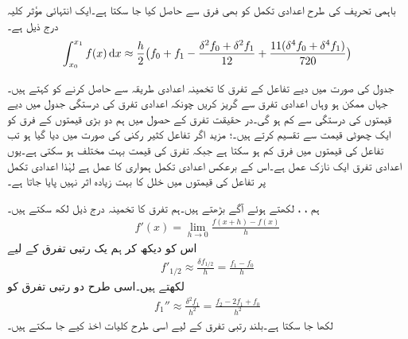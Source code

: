 باہمی تحریف کی طرح اعدادی تکمل کو بھی فرق سے حاصل کیا جا سکتا ہے۔ایک انتہائی مؤثر کلیہ درج ذیل   ہے۔
\begin{align}
\int_{x_0}^{x_1}f(x)\dif x\approx \frac{h}{2}\big(f_0+f_1-\frac{\delta^2 f_0+\delta^2f_1}{12}+\frac{11(\delta^4f_0+\delta^4f_1)}{720}\big)
\end{align}

جدول کی صورت میں دیے تفاعل کے تفرق کا تخمینہ اعدادی طریقہ  سے حاصل کرنے  کو  کہتے ہیں۔ جہاں ممکن ہو وہاں اعدادی تفرق سے گریز کریں چونکہ اعدادی تفرق کی درستگی  جدول میں دیے قیمتوں کی درستگی سے کم ہو گی۔در حقیقت تفرق کے حصول میں ہم دو بڑی قیمتوں کے فرق کو ایک چھوٹی قیمت سے تقسیم کرتے ہیں۔؛ مزید اگر تفاعل کثیر رکنی  کی صورت میں دیا گیا ہو تب تفاعل کی قیمتوں میں فرق کم ہو سکتا ہے جبکہ تفرق کی قیمت بہت مختلف ہو سکتی ہے۔یوں اعدادی تفرق ایک نازک عمل ہے۔اس کے برعکس اعدادی تکمل ہمواری کا عمل ہے لہٰذا اعدادی تکمل  پر تفاعل کی قیمتوں میں خلل کا بہت زیادہ اثر نہیں پایا جاتا ہے۔

ہم ، ،  لکھتے ہوئے آگے بڑھتے ہیں۔ہم تفرق کا تخمینہ درج ذیل لکھ سکتے ہیں۔
\begin{align*}
f'(x)=\lim_{h\to 0}\frac{f(x+h)-f(x)}{h}
\end{align*}
اس کو دیکھ کر ہم یک رتبی تفرق کے لیے
\begin{align}\label{مساوات_اعدادی_تفرق_کلیہ_الف}
f'_{1/2}\approx \frac{\delta f_{1/2}}{h}=\frac{f_1-f_0}{h}
\end{align}
لکھتے ہیں۔اسی طرح دو رتبی تفرق کو
\begin{align}\label{مساوات_اعدادی_تفرق_کلیہ_ب}
f_1''\approx \frac{\delta^2 f_1}{h^2}=\frac{f_2-2f_1+f_0}{h^2}
\end{align}
لکھا جا سکتا ہے۔بلند رتبی تفرق کے لیے اسی طرح کلیات اخذ کیے جا سکتے ہیں۔

